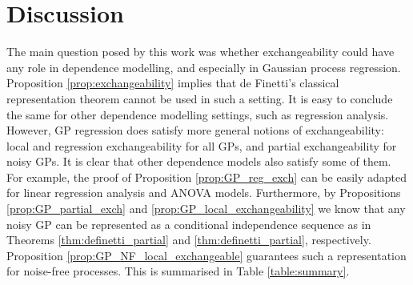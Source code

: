 

\section{Discussion} \label{section:discussion}


The main question posed by this work was whether exchangeability could have any role in dependence modelling, and especially in Gaussian process regression. Proposition \ref{prop:exchangeability} implies that de Finetti's classical representation theorem cannot be used in such a setting. It is easy to conclude the same for other dependence modelling settings, such as regression analysis. 
\\


However, GP regression does satisfy more general notions of exchangeability: local and regression exchangeability for all GPs, and partial exchangeability for noisy GPs. It is clear that other dependence models also satisfy some of them. For example, the proof of Proposition \ref{prop:GP_reg_exch} can be easily adapted for linear regression analysis and ANOVA models. Furthermore, by Propositions \ref{prop:GP_partial_exch} and \ref{prop:GP_local_exchangeability} we know that any noisy GP can be represented as a conditional independence sequence as in Theorems \ref{thm:definetti_partial} and \ref{thm:definetti_partial}, respectively. Proposition \ref{prop:GP_NF_local_exchangeable} guarantees such a representation for noise-free processes. This is summarised in Table \ref{table:summary}.



